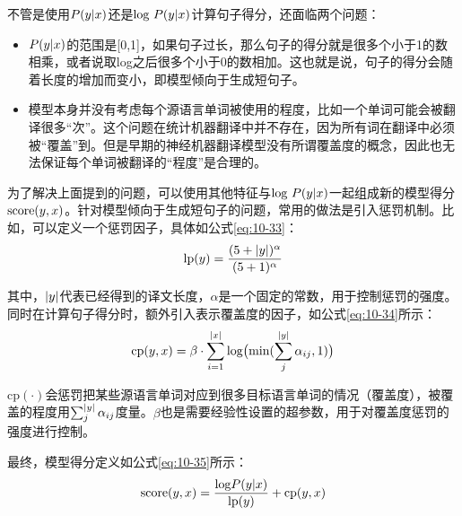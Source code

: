 \parinterval 不管是使用${P}({{y}} | {{x}})$还是$\textrm{log } {P}({{y}} | {{x}})$计算句子得分，还面临两个问题：

\begin{itemize}
\vspace{0.5em}
\item ${P}({{y}} | {{x}})$的范围是[0,1]，如果句子过长，那么句子的得分就是很多个小于1的数相乘，或者说取log之后很多个小于0的数相加。这也就是说，句子的得分会随着长度的增加而变小，即模型倾向于生成短句子。
\vspace{0.5em}
\item 模型本身并没有考虑每个源语言单词被使用的程度，比如一个单词可能会被翻译很多“次”。这个问题在统计机器翻译中并不存在，因为所有词在翻译中必须被“覆盖”到。但是早期的神经机器翻译模型没有所谓覆盖度的概念，因此也无法保证每个单词被翻译的“程度”是合理的。
\vspace{0.5em}
\end{itemize}

\parinterval 为了解决上面提到的问题，可以使用其他特征与$\textrm{log } {P} ({{y}} | {{x}})$一起组成新的模型得分$\textrm{score} ( {{y}} , {{x}})$。针对模型倾向于生成短句子的问题，常用的做法是引入惩罚机制。比如，可以定义一个惩罚因子，具体如公式\eqref{eq:10-33}：
\begin{eqnarray}
\textrm{lp}({{y}}) = \frac {(5+ |{{y}}|)^{\alpha}} {(5+1)^{\alpha}}
\label{eq:10-33}
\end{eqnarray}

\noindent 其中，$|{{y}}|$代表已经得到的译文长度，$\alpha$是一个固定的常数，用于控制惩罚的强度。同时在计算句子得分时，额外引入表示覆盖度的因子，如公式\eqref{eq:10-34}所示：
\begin{eqnarray}
\textrm{cp}({{y}} , {{x}}) = \beta \cdot \sum_{i=1}^{|{{x}}|} \textrm{log} \big(\textrm{min}(\sum_j^{|{{y}}|} \alpha_{ij},1 ) \big)
\label{eq:10-34}
\end{eqnarray}

\noindent $\textrm{cp}(\cdot)$会惩罚把某些源语言单词对应到很多目标语言单词的情况（覆盖度），被覆盖的程度用$\sum_j^{|{{y}}|} \alpha_{ij}$度量。$\beta$也是需要经验性设置的超参数，用于对覆盖度惩罚的强度进行控制。

\parinterval 最终，模型得分定义如公式\eqref{eq:10-35}所示：
\begin{eqnarray}
\textrm{score} ( {{y}} , {{x}}) = \frac{\textrm{log} {P}({{y}} | {{x}})} {\textrm{lp}({{y}})} + \textrm{cp}({{y}} , {{x}})
\label{eq:10-35}
\end{eqnarray}

